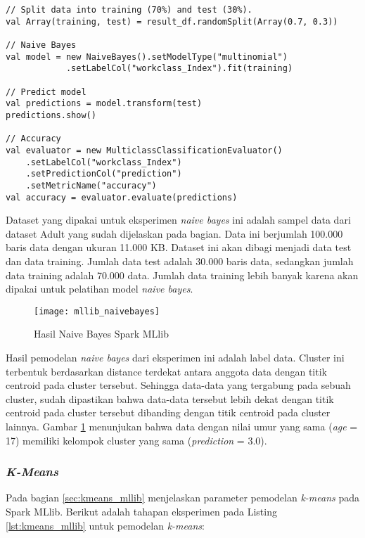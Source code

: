\begin{lstlisting}[basicstyle=\ttfamily, frame=single,
	columns=fullflexible, keepspaces=true, breaklines=true, label=lst:naivebayes_mllib, caption=Eksperimen Naive Bayes Spark MLlib]
// Split data into training (70%) and test (30%).
val Array(training, test) = result_df.randomSplit(Array(0.7, 0.3))

// Naive Bayes
val model = new NaiveBayes().setModelType("multinomial")
			.setLabelCol("workclass_Index").fit(training)
			
// Predict model
val predictions = model.transform(test)
predictions.show()

// Accuracy
val evaluator = new MulticlassClassificationEvaluator()
	.setLabelCol("workclass_Index")
	.setPredictionCol("prediction")
	.setMetricName("accuracy")
val accuracy = evaluator.evaluate(predictions)

\end{lstlisting}



\newpage
\noindent Dataset yang dipakai untuk eksperimen \textit{naive bayes} ini adalah sampel data dari dataset Adult yang sudah dijelaskan pada bagian. Data ini berjumlah 100.000 baris data dengan ukuran 11.000 KB. Dataset ini akan dibagi menjadi data test dan data training. Jumlah data test adalah 30.000 baris data, sedangkan jumlah data training adalah 70.000 data. Jumlah data training lebih banyak karena akan dipakai untuk pelatihan model \textit{naive bayes}.

\begin{figure}[H]
	\centering
	\texttt{[image: mllib\_naivebayes]}
	\caption{Hasil Naive Bayes Spark MLlib}
	\label{fig:mllib_naivebayes}
\end{figure}

\noindent Hasil pemodelan \textit{naive bayes} dari eksperimen ini adalah label data. Cluster ini terbentuk berdasarkan distance terdekat antara anggota data dengan titik centroid pada cluster tersebut. Sehingga data-data yang tergabung pada sebuah cluster, sudah dipastikan bahwa data-data tersebut lebih dekat dengan titik centroid pada cluster tersebut dibanding dengan titik centroid pada cluster lainnya. Gambar \ref{fig:mllib_naivebayes} menunjukan bahwa data dengan nilai umur yang sama (\textit{age} = 17) memiliki kelompok cluster yang sama (\textit{prediction} = 3.0).


\subsubsection{\textit{K-Means}}
\noindent Pada bagian \ref{sec:kmeans_mllib} menjelaskan parameter pemodelan \textit{k-means} pada Spark MLlib. Berikut adalah tahapan eksperimen pada Listing \ref{lst:kmeans_mllib} untuk pemodelan \textit{k-means}:

